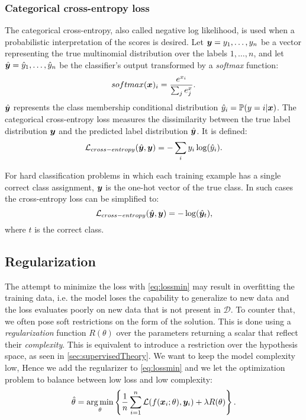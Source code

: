 \subsubsection{Categorical cross-entropy loss}
The categorical cross-entropy, also called negative log likelihood, is
used when a probabilistic interpretation of the scores is desired. Let
$\bm{y}=y_1,\dots,y_n$ be a vector representing the true multinomial
distribution over the labels $1,\dots,n$, and let
$\hat{\bm{y}}=\hat{y}_1,\dots,\hat{y}_n$ be the classifier's output
transformed by a \emph{softmax} function:
\begin{equation*}
  softmax(\bm{x})_i=\frac{e^{x_i}}{\sum_j e^x_j}.
\end{equation*}
$\hat{\bm{y}}$ represents the class membership conditional
distribution $\hat{y}_i=\mathbb{P}(y=i|\bm{x})$. The categorical
cross-entropy loss measures the dissimilarity between the true label 
distribution $\bm{y}$ and the predicted label distribution
$\hat{\bm{y}}$. It is defined:
\begin{equation*}
  \mathcal{L}_{cross-entropy}(\hat{\bm{y}},\bm{y})=-\sum_i y_i\log(\hat{y}_i).
\end{equation*}

For hard classification problems in which each training example has a
single correct class assignment, $\bm{y}$ is the one-hot vector of
the true class. In such cases the cross-entropy loss can be simplified
to:
\begin{equation*}
  \mathcal{L}_{cross-entropy}(\hat{\bm{y}},\bm{y}) = -\log(\hat{\bm{y}}_t),
\end{equation*}
where $t$ is the correct class.

\subsection{Regularization}
The attempt to minimize the loss with \eqref{eq:lossmin} may result
in overfitting the training data, i.e. the model loses the capability
to generalize to new data and the loss evaluates poorly on new data
that is not present in $\mathcal{D}$. To counter that, we often pose
soft restrictions on the form of the solution. This is done using a
\emph{regularization}
function $R(\theta)$ over the parameters returning a scalar that
reflect their \emph{complexity}. This is equivalent to introduce a
restriction over the hypothesis space, as seen in
\cref{sec:supervisedTheory}. We want to keep the model complexity low,
Hence we add the regularizer to \eqref{eq:lossmin} and we let the
optimization problem to balance between low loss and low complexity:
\begin{equation}\label{eq:lossminReg}
  \hat\theta=\operatorname*{arg\,min}_\theta\left\{\frac{1}{n}\sum_{i=1}^n\mathcal{L}(f(\bm{x}_i;\theta),\bm{y}_i)+\lambda
    R(\theta)\right\}.
\end{equation}

